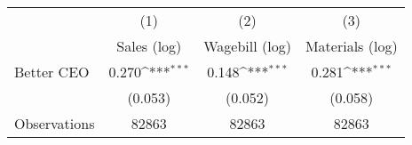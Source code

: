 {
\def\sym#1{\ifmmode^{#1}\else\(^{#1}\)\fi}
\begin{tabular}{l*{3}{c}}
\hline\hline
                    &\multicolumn{1}{c}{(1)}&\multicolumn{1}{c}{(2)}&\multicolumn{1}{c}{(3)}\\
                    &\multicolumn{1}{c}{Sales (log)}&\multicolumn{1}{c}{Wagebill (log)}&\multicolumn{1}{c}{Materials (log)}\\
\hline
Better CEO          &       0.270\sym{***}&       0.148\sym{***}&       0.281\sym{***}\\
                    &     (0.053)         &     (0.052)         &     (0.058)         \\
\hline
Observations        &       82863         &       82863         &       82863         \\
\hline\hline
\end{tabular}
}
